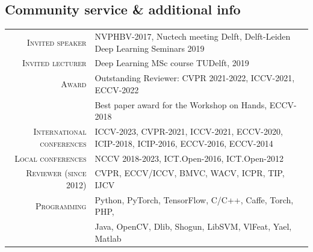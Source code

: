 \documentclass[a4paper, oneside, final]{scrartcl}
\begin{document}
\begin{center}
		\section{Community service \& additional info}
		\begin{tabular}{r@{\hskip 0.3in}p{12.3cm}}
            \textsc{Invited speaker}            & NVPHBV-2017, Nuctech meeting Delft, Delft-Leiden Deep Learning Seminars 2019\\
            \textsc{Invited lecturer}           & Deep Learning MSc course TUDelft, 2019\\
            \textsc{Award}                      & Outstanding Reviewer: CVPR 2021-2022, ICCV-2021, ECCV-2022\\ 
                                                & Best paper award for the Workshop on Hands, ECCV-2018\\  
            \textsc{International conferences}  & ICCV-2023, CVPR-2021, ICCV-2021, ECCV-2020, ICIP-2018, ICIP-2016, ECCV-2016, ECCV-2014\\
            \textsc{Local conferences}          & NCCV 2018-2023, ICT.Open-2016, ICT.Open-2012\\
            \textsc{Reviewer (since 2012)}      & CVPR, ECCV/ICCV, BMVC, WACV, ICPR, TIP, IJCV\\
			\textsc{Programming}                & Python, PyTorch, TensorFlow, C\slash C++, Caffe, Torch, PHP,\\ 
			                                    & Java, OpenCV, Dlib, Shogun, LibSVM, VlFeat, Yael, Matlab\\
		\end{tabular}
	\end{center}
\end{document}
